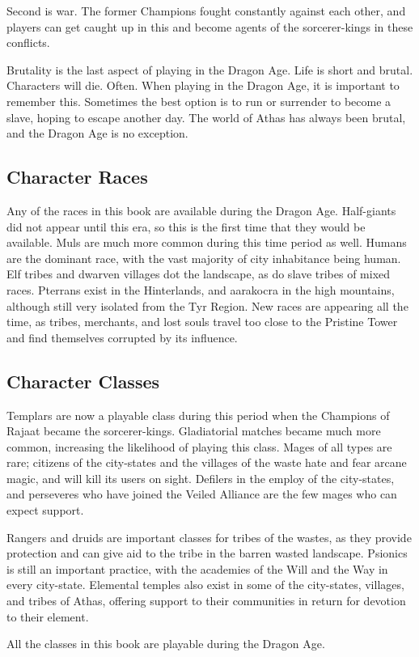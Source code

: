 Second is war. The former Champions fought constantly against each other, and players can get caught up in this and become agents of the sorcerer-kings in these conflicts.

Brutality is the last aspect of playing in the Dragon Age. Life is short and brutal. Characters will die. Often. When playing in the Dragon Age, it is important to remember this. Sometimes the best option is to run or surrender to become a slave, hoping to escape another day. The world of Athas has always been brutal, and the Dragon Age is no exception.

\subsection{Character Races}
Any of the races in this book are available during the Dragon Age. Half-giants did not appear until this era, so this is the first time that they would be available. Muls are much more common during this time period as well. Humans are the dominant race, with the vast majority of city inhabitance being human. Elf tribes and dwarven villages dot the landscape, as do slave tribes of mixed races. Pterrans exist in the Hinterlands, and aarakocra in the high mountains, although still very isolated from the Tyr Region. New races are appearing all the time, as tribes, merchants, and lost souls travel too close to the Pristine Tower and find themselves corrupted by its influence.

\subsection{Character Classes}
Templars are now a playable class during this period when the Champions of Rajaat became the sorcerer-kings. Gladiatorial matches became much more common, increasing the likelihood of playing this class. Mages of all types are rare; citizens of the city-states and the villages of the waste hate and fear arcane magic, and will kill its users on sight. Defilers in the employ of the city-states, and perseveres who have joined the Veiled Alliance are the few mages who can expect support.

Rangers and druids are important classes for tribes of the wastes, as they provide protection and can give aid to the tribe in the barren wasted landscape. Psionics is still an important practice, with the academies of the Will and the Way in every city-state. Elemental temples also exist in some of the city-states, villages, and tribes of Athas, offering support to their communities in return for devotion to their element.

All the classes in this book are playable during the Dragon Age.
